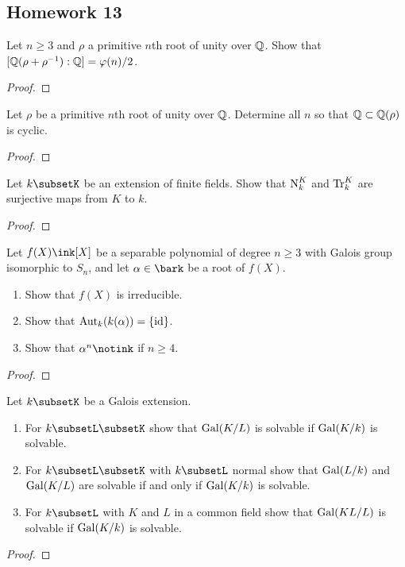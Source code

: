 \subsection{Homework 13}
\begin{problem}
Let $n\geq 3$ and $\rho$ a primitive $n$th root of unity over $\mathbb{Q}$. Show
that $[\mathbb{Q}(\rho+\rho^{-1}):\mathbb{Q}]=\varphi(n)/2$.
\end{problem}
\begin{proof}
\end{proof}

\begin{problem}
Let $\rho$ be a primitive $n$th root of unity over $\mathbb{Q}$. Determine all
$n$ so that $\mathbb{Q}\subset\mathbb{Q}(\rho)$ is cyclic.
\end{problem}
\begin{proof}
\end{proof}

\begin{problem}
  Let $k\subsetK$ be an extension of finite fields. Show that
  $\operatorname{N}_k^K$ and $\operatorname{Tr}_k^K$ are surjective maps from $K$ to
  $k$.
\end{problem}
\begin{proof}
\end{proof}

\begin{problem}
  Let $f(X)\ink[X]$ be a separable polynomial of degree $n\geq 3$ with
  Galois group isomorphic to $S_n$, and let $\alpha\in\bark$ be a root
  of $f(X)$.
  \begin{enumerate}[label=(\alph*),noitemsep]
  \item Show that $f(X)$ is irreducible.
  \item Show that $\operatorname{Aut}_k(k(\alpha))=\{\operatorname{id}\}$.
  \item Show that $\alpha^n\notink$ if $n\geq 4$.
  \end{enumerate}
\end{problem}
\begin{proof}
\end{proof}

\begin{problem}
  Let $k\subsetK$ be a Galois extension.
\begin{enumerate}[label=(\alph*),noitemsep]
\item For $k\subsetL\subsetK$ show that $\operatorname{Gal}(K/L)$ is
  solvable if $\operatorname{Gal}(K/k)$ is solvable.
\item For $k\subsetL\subsetK$ with $k\subsetL$ normal show
  that $\operatorname{Gal}(L/k)$ and $\operatorname{Gal}(K/L)$ are solvable if and only if
  $\operatorname{Gal}(K/k)$ is solvable.
\item For $k\subsetL$ with $K$ and $L$ in a common field show
  that $\operatorname{Gal}(KL/L)$ is solvable if $\operatorname{Gal}(K/k)$ is solvable.
\end{enumerate}
\end{problem}
\begin{proof}
\end{proof}


